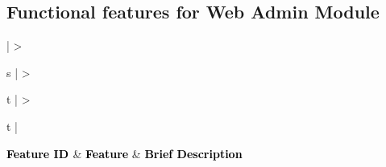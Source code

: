 \documentclass[hidelinks,a4paper]{article}
\begin{document}
	\subsection{Functional features for Web Admin Module}
	\begin{center}
		
	\bigskip
					
	{
	\setlength{\extrarowheight}{2pt}
				
					
	\newcolumntype{b}{X}
					
				
	\begin{tabularx}{\textwidth}{ | >{\ttfamily\raggedright\arraybackslash} s 
	 | >{\ttfamily\raggedright\arraybackslash} t 
     | >{\ttfamily\raggedright\arraybackslash} t | }
						
	\hline
						
	{\textbf{\textcolor{black}{\large {Feature ID} \newline}}} & {\textbf{\textcolor{black}{\large {Feature}}}} & \textbf{\textcolor{black}{\large {Brief Description}}} \\
						

\end{tabularx}}
\end{center}
\end{document}
